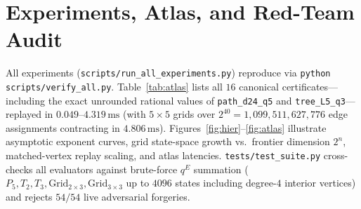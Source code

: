 \documentclass[10pt,twocolumn]{article}
\begin{document}
\section{Experiments, Atlas, and Red-Team Audit}\label{sec:experiments}
All experiments (\texttt{scripts/run\_all\_experiments.py}) reproduce via \texttt{python scripts/verify\_all.py}. Table~\ref{tab:atlas} lists all $16$ canonical certificates—including the exact unrounded rational values of \texttt{path\_d24\_q5} and \texttt{tree\_L5\_q3}—replayed in $0.049$--$4.319\,\mathrm{ms}$ (with $5\times 5$ grids over $2^{40} = 1{,}099{,}511{,}627{,}776$ edge assignments contracting in $4.806\,\mathrm{ms}$). Figures~\ref{fig:hier}--\ref{fig:atlas} illustrate asymptotic exponent curves, grid state-space growth vs.\ frontier dimension $2^n$, matched-vertex replay scaling, and atlas latencies. \texttt{tests/test\_suite.py} cross-checks all evaluators against brute-force $q^E$ summation ($P_5, T_2, T_3, \mathrm{Grid}_{2\times 3}, \mathrm{Grid}_{3\times 3}$ up to $4096$ states including degree-$4$ interior vertices) and rejects $54/54$ live adversarial forgeries.
\end{document}
